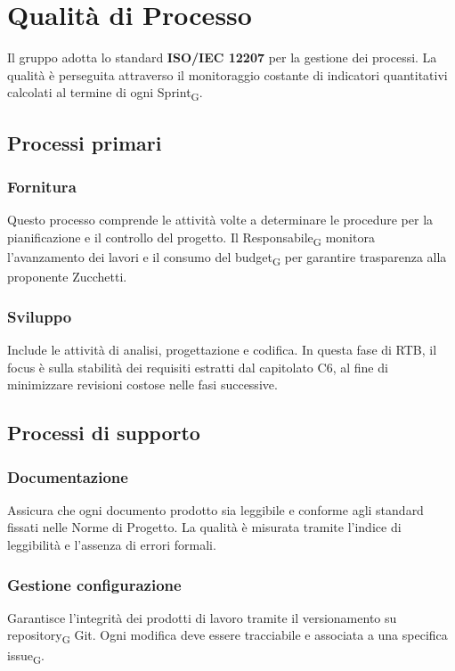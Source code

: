 \section{Qualità di Processo}
Il gruppo adotta lo standard \textbf{ISO/IEC 12207} per la gestione dei processi. La qualità è perseguita attraverso il monitoraggio costante di indicatori quantitativi calcolati al termine di ogni Sprint\textsubscript{G}.

\subsection{Processi primari}
\subsubsection{Fornitura}
Questo processo comprende le attività volte a determinare le procedure per la pianificazione e il controllo del progetto. Il Responsabile\textsubscript{G} monitora l'avanzamento dei lavori e il consumo del budget\textsubscript{G} per garantire trasparenza alla proponente Zucchetti.

\subsubsection{Sviluppo}
Include le attività di analisi, progettazione e codifica. In questa fase di RTB, il focus è sulla stabilità dei requisiti estratti dal capitolato C6, al fine di minimizzare revisioni costose nelle fasi successive.

\subsection{Processi di supporto}
\subsubsection{Documentazione}
Assicura che ogni documento prodotto sia leggibile e conforme agli standard fissati nelle Norme di Progetto. La qualità è misurata tramite l'indice di leggibilità e l'assenza di errori formali.

\subsubsection{Gestione configurazione}
Garantisce l'integrità dei prodotti di lavoro tramite il versionamento su repository\textsubscript{G} Git. Ogni modifica deve essere tracciabile e associata a una specifica issue\textsubscript{G}.

